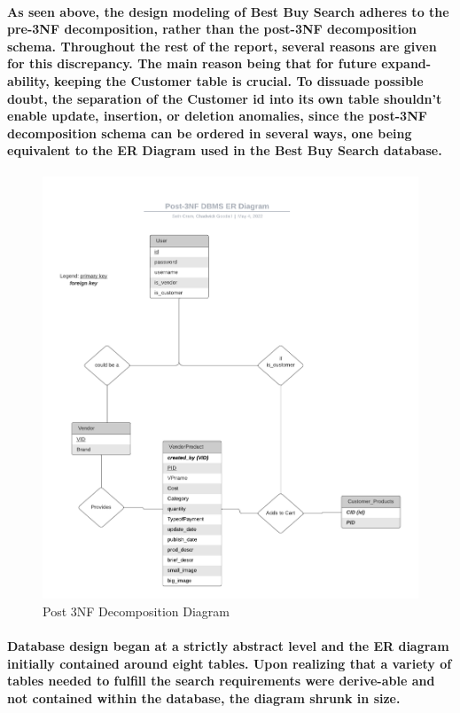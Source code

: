 \documentclass[sigconf]{acmart}
\begin{document}
\paragraph{ As seen above, the design modeling of Best Buy Search adheres to the pre-3NF decomposition, rather than the post-3NF decomposition schema. Throughout the rest of the report, several reasons are given for this discrepancy. The main reason being that for future expand-ability, keeping the Customer table is crucial. To dissuade possible doubt, the separation of the Customer id into its own table shouldn't enable update, insertion, or deletion anomalies, since the post-3NF decomposition schema can be ordered in several ways, one being equivalent to the ER Diagram used in the Best Buy Search database. }

\begin{figure}[H]
    \centering
    \includegraphics[scale=0.4]{Pre_Post-3NF DBMS ER diagram (UML notation) (4).png}
    \caption{Post 3NF Decomposition Diagram}
    \label{fig:my_label}
\end{figure}

\paragraph{ Database design began at a strictly abstract level and the ER diagram initially contained around eight tables. Upon realizing that a variety of tables needed to fulfill the search requirements were derive-able and not contained within the database, the diagram shrunk in size. }
\end{document}
